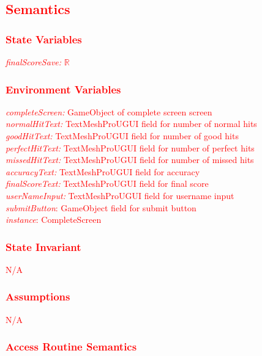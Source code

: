 \documentclass[12pt]{article}
\begin{document}
\subsection {\textcolor{red}{Semantics}}

\subsubsection {\textcolor{red}{State Variables}}
\textcolor{red}{\textit{finalScoreSave: }$\mathbb{R}$}

\subsubsection {\textcolor{red}{Environment Variables}}
\textcolor{red}{\textit{completeScreen:} GameObject of complete screen screen}\\
\textcolor{red}{\textit{normalHitText:} TextMeshProUGUI field for number of normal hits}\\
\textcolor{red}{\textit{goodHitText:} TextMeshProUGUI field for number of good hits}\\
\textcolor{red}{\textit{perfectHitText:} TextMeshProUGUI field for number of perfect hits}\\
\textcolor{red}{\textit{missedHitText:} TextMeshProUGUI field for number of missed hits}\\
\textcolor{red}{\textit{accuracyText:} TextMeshProUGUI field for accuracy}\\
\textcolor{red}{\textit{finalScoreText:} TextMeshProUGUI field for final score}\\
\textcolor{red}{\textit{userNameInput:} TextMeshProUGUI field for username input}\\
\textcolor{red}{\textit{submitButton}: GameObject field for submit button}\\
\textcolor{red}{\textit{instance}: CompleteScreen}

\subsubsection {\textcolor{red}{State Invariant}}
\textcolor{red}{N/A}

\subsubsection {\textcolor{red}{Assumptions}}
\textcolor{red}{N/A}

\subsubsection {\textcolor{red}{Access Routine Semantics}}
\end{document}
